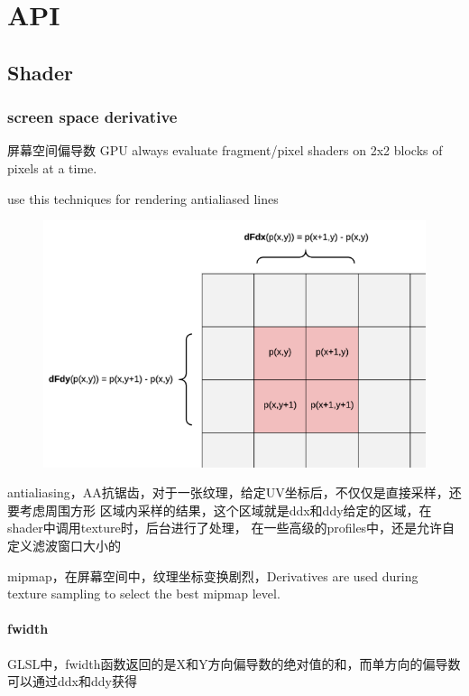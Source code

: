 \chapter{API}

\section{Shader}

\subsection{screen space derivative}
屏幕空间偏导数
GPU always evaluate fragment/pixel shaders on 2x2 blocks of pixels at a time.

use this techniques for rendering antialiased lines

\begin{figure}[h]
    \centering
    \includegraphics[width=\textwidth]{images/Shader-Derivatives.png}
\end{figure}

antialiasing，AA抗锯齿，对于一张纹理，给定UV坐标后，不仅仅是直接采样，还要考虑周围方形
区域内采样的结果，这个区域就是ddx和ddy给定的区域，在shader中调用texture时，后台进行了处理，
在一些高级的profiles中，还是允许自定义滤波窗口大小的

mipmap，在屏幕空间中，纹理坐标变换剧烈，Derivatives are used during texture sampling to
select the best mipmap level.

\subsubsection{fwidth}
GLSL中，fwidth函数返回的是X和Y方向偏导数的绝对值的和，而单方向的偏导数可以通过ddx和ddy获得

